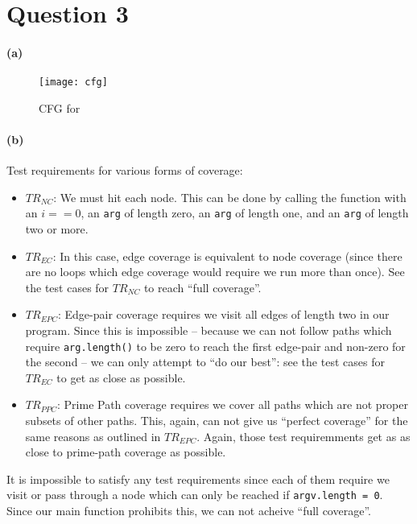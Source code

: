 \documentclass[12pt]{article}
\begin{document}
\section*{Question 3}

\paragraph{(a)}
\begin{figure*}[htb]
  \begin{center}
    \texttt{[image: cfg]}
  \end{center}
  \caption{CFG for \rmfamily{}}
\end{figure*}

\paragraph{(b)} Test requirements for various forms of coverage:
\begin{itemize}
  \item $TR_{NC}$: We must hit each node. This can be done by calling the function with an $i == 0$, an {\tt arg} of length zero, an {\tt arg} of length one, and an {\tt arg} of length two or more.
  \item $TR_{EC}$: In this case, edge coverage is equivalent to node coverage (since there are no loops which edge coverage would require we run more than once). See the test cases for $TR_{NC}$ to reach ``full coverage''.
  \item $TR_{EPC}$: Edge-pair coverage requires we visit all edges of length two in our program. Since this is impossible -- because we can not follow paths which require {\tt arg.length()} to be zero to reach the first edge-pair and non-zero for the second -- we can only attempt to ``do our best'': see the test cases for $TR_{EC}$ to get as close as possible.
  \item $TR_{PPC}$: Prime Path coverage requires we cover all paths which are not proper subsets of other paths. This, again, can not give us ``perfect coverage'' for the same reasons as outlined in $TR_{EPC}$. Again, those test requiremments get as as close to prime-path coverage as possible.
\end{itemize}

It is impossible to satisfy any test requirements since each of them require we visit or pass through a node which can only be reached if \verb+argv.length = 0+. Since our main function prohibits this, we can not acheive ``full coverage''.
\end{document}
